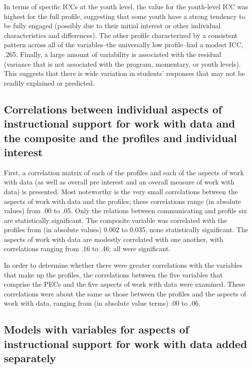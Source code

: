 \documentclass[]{msu-thesis}
\theoremstyle{definition}
\theoremstyle{definition}
\theoremstyle{definition}
\theoremstyle{remark}
\begin{document}
In terms of specific ICCs at the youth level, the value for the
youth-level ICC was highest for the full profile, suggesting that some
youth have a strong tendency to be fully engaged (possibly due to their
initial interest or other individual characteristics and differences).
The other profile characterized by a consistent pattern across all of
the variables--the universally low profile--had a modest ICC, .265.
Finally, a large amount of variability is associated with the residual
(variance that is not associated with the program, momentary, or youth
levels). This suggests that there is wide variation in students'
responses that may not be readily explained or predicted.

\subsection{Correlations between individual aspects of instructional
support for work with data and the composite and the profiles and
individual
interest}\label{correlations-between-individual-aspects-of-instructional-support-for-work-with-data-and-the-composite-and-the-profiles-and-individual-interest}

First, a correlation matrix of each of the profiles and each of the
aspects of work with data (as well as overall pre interest and an
overall measure of work with data) is presented. Most noteworthy is the
very small correlations between the aspects of work with data and the
profiles; these correlations range (in absolute values) from .00 to .05.
Only the relations between communicating and profile six are
statistically significant. The composite variable was correlated with
the profiles from (in absolute values) 0.002 to 0.035, none
statistically significant. The aspects of work with data are modestly
correlated with one another, with correlations ranging from .16 to .46;
all were significant.

In order to determine whether there were greater correlations with the
variables that make up the profiles, the correlations between the five
variables that comprise the PECs and the five aspects of work with data
were examined. These correlations were about the same as those between
the profiles and the aspects of work with data, ranging from (in
absolute value terms) .00 to .06.

\subsection{Models with variables for aspects of instructional support
for work with data added
separately}\label{models-with-variables-for-aspects-of-instructional-support-for-work-with-data-added-separately}
\end{document}
